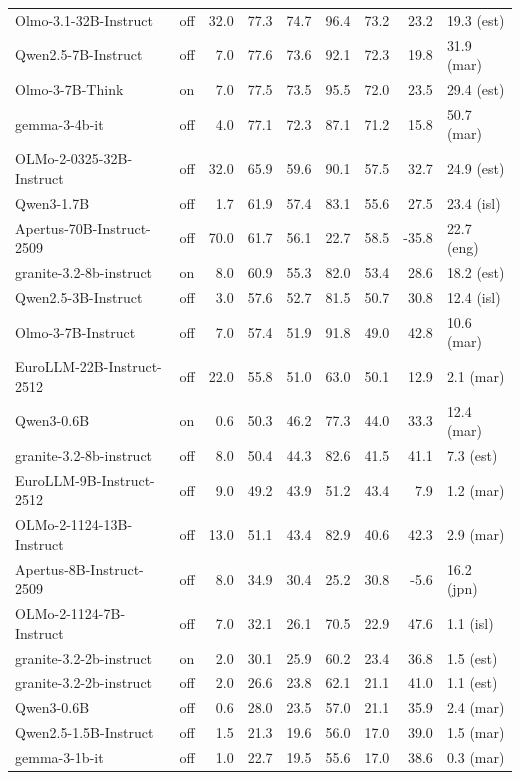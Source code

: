 \begin{table}[p]
\begin{tabular}{llrrrrrrl}
Olmo-3.1-32B-Instruct & off & 32.0 & 77.3 & 74.7 & 96.4 & 73.2 & 23.2 & 19.3 (est) \\
Qwen2.5-7B-Instruct & off & 7.0 & 77.6 & 73.6 & 92.1 & 72.3 & 19.8 & 31.9 (mar) \\
Olmo-3-7B-Think & on & 7.0 & 77.5 & 73.5 & 95.5 & 72.0 & 23.5 & 29.4 (est) \\
gemma-3-4b-it & off & 4.0 & 77.1 & 72.3 & 87.1 & 71.2 & 15.8 & 50.7 (mar) \\
OLMo-2-0325-32B-Instruct & off & 32.0 & 65.9 & 59.6 & 90.1 & 57.5 & 32.7 & 24.9 (est) \\
Qwen3-1.7B & off & 1.7 & 61.9 & 57.4 & 83.1 & 55.6 & 27.5 & 23.4 (isl) \\
Apertus-70B-Instruct-2509 & off & 70.0 & 61.7 & 56.1 & 22.7 & 58.5 & -35.8 & 22.7 (eng) \\
granite-3.2-8b-instruct & on & 8.0 & 60.9 & 55.3 & 82.0 & 53.4 & 28.6 & 18.2 (est) \\
Qwen2.5-3B-Instruct & off & 3.0 & 57.6 & 52.7 & 81.5 & 50.7 & 30.8 & 12.4 (isl) \\
Olmo-3-7B-Instruct & off & 7.0 & 57.4 & 51.9 & 91.8 & 49.0 & 42.8 & 10.6 (mar) \\
EuroLLM-22B-Instruct-2512 & off & 22.0 & 55.8 & 51.0 & 63.0 & 50.1 & 12.9 & 2.1 (mar) \\
Qwen3-0.6B & on & 0.6 & 50.3 & 46.2 & 77.3 & 44.0 & 33.3 & 12.4 (mar) \\
granite-3.2-8b-instruct & off & 8.0 & 50.4 & 44.3 & 82.6 & 41.5 & 41.1 & 7.3 (est) \\
EuroLLM-9B-Instruct-2512 & off & 9.0 & 49.2 & 43.9 & 51.2 & 43.4 & 7.9 & 1.2 (mar) \\
OLMo-2-1124-13B-Instruct & off & 13.0 & 51.1 & 43.4 & 82.9 & 40.6 & 42.3 & 2.9 (mar) \\
Apertus-8B-Instruct-2509 & off & 8.0 & 34.9 & 30.4 & 25.2 & 30.8 & -5.6 & 16.2 (jpn) \\
OLMo-2-1124-7B-Instruct & off & 7.0 & 32.1 & 26.1 & 70.5 & 22.9 & 47.6 & 1.1 (isl) \\
granite-3.2-2b-instruct & on & 2.0 & 30.1 & 25.9 & 60.2 & 23.4 & 36.8 & 1.5 (est) \\
granite-3.2-2b-instruct & off & 2.0 & 26.6 & 23.8 & 62.1 & 21.1 & 41.0 & 1.1 (est) \\
Qwen3-0.6B & off & 0.6 & 28.0 & 23.5 & 57.0 & 21.1 & 35.9 & 2.4 (mar) \\
Qwen2.5-1.5B-Instruct & off & 1.5 & 21.3 & 19.6 & 56.0 & 17.0 & 39.0 & 1.5 (mar) \\
gemma-3-1b-it & off & 1.0 & 22.7 & 19.5 & 55.6 & 17.0 & 38.6 & 0.3 (mar) \\

\end{tabular}
\end{table}
